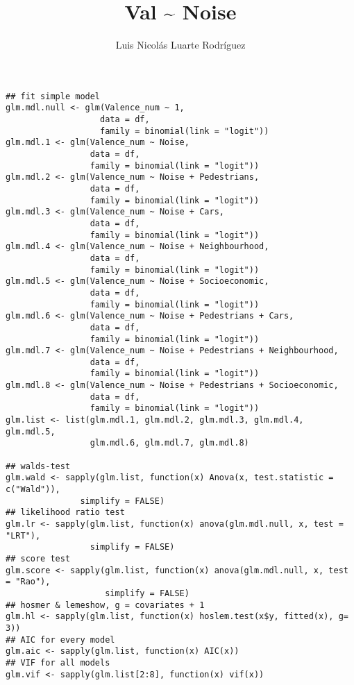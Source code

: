 \documentclass[11pt]{article}
\author{Luis Nicolás Luarte Rodríguez}
\date{}
\title{Val \textasciitilde{} Noise}
\begin{document}
\maketitle
\begin{verbatim}
## fit simple model
glm.mdl.null <- glm(Valence_num ~ 1,
                   data = df,
                   family = binomial(link = "logit"))
glm.mdl.1 <- glm(Valence_num ~ Noise,
                 data = df,
                 family = binomial(link = "logit"))
glm.mdl.2 <- glm(Valence_num ~ Noise + Pedestrians,
                 data = df,
                 family = binomial(link = "logit"))
glm.mdl.3 <- glm(Valence_num ~ Noise + Cars,
                 data = df,
                 family = binomial(link = "logit"))
glm.mdl.4 <- glm(Valence_num ~ Noise + Neighbourhood,
                 data = df,
                 family = binomial(link = "logit"))
glm.mdl.5 <- glm(Valence_num ~ Noise + Socioeconomic,
                 data = df,
                 family = binomial(link = "logit"))
glm.mdl.6 <- glm(Valence_num ~ Noise + Pedestrians + Cars,
                 data = df,
                 family = binomial(link = "logit"))
glm.mdl.7 <- glm(Valence_num ~ Noise + Pedestrians + Neighbourhood,
                 data = df,
                 family = binomial(link = "logit"))
glm.mdl.8 <- glm(Valence_num ~ Noise + Pedestrians + Socioeconomic,
                 data = df,
                 family = binomial(link = "logit"))
glm.list <- list(glm.mdl.1, glm.mdl.2, glm.mdl.3, glm.mdl.4, glm.mdl.5,
                 glm.mdl.6, glm.mdl.7, glm.mdl.8)

## walds-test
glm.wald <- sapply(glm.list, function(x) Anova(x, test.statistic = c("Wald")),
               simplify = FALSE)
## likelihood ratio test
glm.lr <- sapply(glm.list, function(x) anova(glm.mdl.null, x, test = "LRT"),
                 simplify = FALSE)
## score test
glm.score <- sapply(glm.list, function(x) anova(glm.mdl.null, x, test = "Rao"),
                    simplify = FALSE)
## hosmer & lemeshow, g = covariates + 1
glm.hl <- sapply(glm.list, function(x) hoslem.test(x$y, fitted(x), g= 3))
## AIC for every model
glm.aic <- sapply(glm.list, function(x) AIC(x))
## VIF for all models
glm.vif <- sapply(glm.list[2:8], function(x) vif(x))


\end{verbatim}
\end{document}
